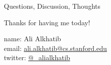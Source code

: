 \documentclass[presentation]{subfiles}
\begin{document}
  \begin{frame}{Questions, Discussion, Thoughts}


      Thanks for having me today!
  
      name: {Ali Alkhatib} \\
      email: \href{mailto:ali.alkhatib@cs.stanford.edu}{ali.alkhatib@cs.stanford.edu} \\
      twitter: \href{https://twitter.com/_alialkhatib}{@\_alialkhatib} \\
  \end{frame}
\end{document}
